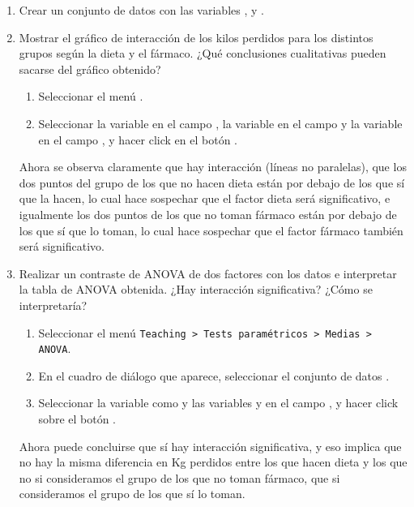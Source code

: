 \begin{enumerate}[leftmargin=*]
\begin{enumerate}
\item Crear un conjunto de datos  con las variables , 
y .

\item Mostrar el gráfico de interacción de los kilos perdidos para los distintos grupos según la dieta y el fármaco.
¿Qué conclusiones cualitativas pueden sacarse del gráfico obtenido? 
\begin{indicacion}
\begin{enumerate}
\item Seleccionar el menú .
\item Seleccionar la variable  en el campo , la variable
 en el campo  y la variable  en el campo , y hacer click en el botón .
\end{enumerate}
Ahora se observa claramente que hay interacción (líneas no paralelas), que los dos puntos del grupo de los que no hacen
dieta están por debajo de los que sí que la hacen, lo cual hace sospechar que el factor dieta será significativo, e
igualmente los dos puntos de los que no toman fármaco están por debajo de los que sí que lo toman, lo cual hace
sospechar que el factor fármaco también será significativo.
\end{indicacion}  

\item Realizar un contraste de ANOVA de dos factores con los datos e interpretar la tabla de ANOVA obtenida. 
¿Hay interacción significativa?
¿Cómo se interpretaría? 
\begin{indicacion}
\begin{enumerate}
\item Seleccionar el menú \texttt{Teaching > Tests paramétricos > Medias > ANOVA}.
\item En el cuadro de diálogo que aparece, seleccionar el conjunto de datos .
\item Seleccionar la variable  como  y las variables
 y  en el campo , y hacer click sobre el botón
.
\end{enumerate}
Ahora puede concluirse que sí hay interacción significativa, y eso implica que no hay la misma diferencia en Kg perdidos
entre los que hacen dieta y los que no si consideramos el grupo de los que no toman fármaco, que si consideramos el
grupo de los que sí lo toman.
\end{indicacion}


\end{enumerate}
\end{enumerate}
